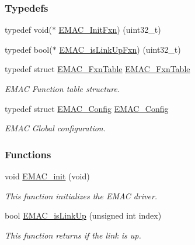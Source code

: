 \subsubsection*{Typedefs}
\begin{DoxyCompactItemize}
\item 
typedef void($\ast$ \hyperlink{_e_m_a_c_8h_a19871b9b03b14b33916f313969f7c275}{E\+M\+A\+C\+\_\+\+Init\+Fxn}) (uint32\+\_\+t)
\item 
typedef bool($\ast$ \hyperlink{_e_m_a_c_8h_a16a68c18205d9338eb80ba15d5c503ae}{E\+M\+A\+C\+\_\+is\+Link\+Up\+Fxn}) (uint32\+\_\+t)
\item 
typedef struct \hyperlink{struct_e_m_a_c___fxn_table}{E\+M\+A\+C\+\_\+\+Fxn\+Table} \hyperlink{_e_m_a_c_8h_a78246359973b8c33dd0758d38da4a120}{E\+M\+A\+C\+\_\+\+Fxn\+Table}
\begin{DoxyCompactList}\small\item\em E\+M\+A\+C Function table structure. \end{DoxyCompactList}\item 
typedef struct \hyperlink{struct_e_m_a_c___config}{E\+M\+A\+C\+\_\+\+Config} \hyperlink{_e_m_a_c_8h_af03639779a3a76b335ac6a4e0329a229}{E\+M\+A\+C\+\_\+\+Config}
\begin{DoxyCompactList}\small\item\em E\+M\+A\+C Global configuration. \end{DoxyCompactList}\end{DoxyCompactItemize}
\subsubsection*{Functions}
\begin{DoxyCompactItemize}
\item 
void \hyperlink{_e_m_a_c_8h_a48ca15f3164b615bacbe55d60c54a79d}{E\+M\+A\+C\+\_\+init} (void)
\begin{DoxyCompactList}\small\item\em This function initializes the E\+M\+A\+C driver. \end{DoxyCompactList}\item 
bool \hyperlink{_e_m_a_c_8h_aea3d89085131b81641c68dc72b9e3388}{E\+M\+A\+C\+\_\+is\+Link\+Up} (unsigned int index)
\begin{DoxyCompactList}\small\item\em This function returns if the link is up. \end{DoxyCompactList}\end{DoxyCompactItemize}


